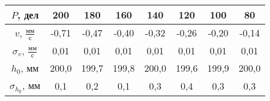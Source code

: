 \begin{tabular}[t]{|c|c|c|c|c|c|c|c|}
\hline
$P$, дел & 200 & 180 & 160 & 140 & 120 & 100 & 80 \\ 
\hline
$v$, $\frac{мм}{с}$ & -0,71 & -0,47 & -0,40 & -0,32 & -0,26 & -0,20 & -0,14 \\ 
\hline
$\sigma_v$, $\frac{мм}{с}$ & 0,01 & 0,01 & 0,01 & 0,01 & 0,01 & 0,01 & 0,01 \\ 
\hline
$h_0$, мм & 200,0 & 199,7 & 199,8 & 200,0 & 199,6 & 199,9 & 200,0 \\ 
\hline
$\sigma_{h_0}$, мм & 0,1 & 0,2 & 0,1 & 0,3 & 0,4 & 0,3 & 0,3 \\ 
\hline
\end{tabular}
